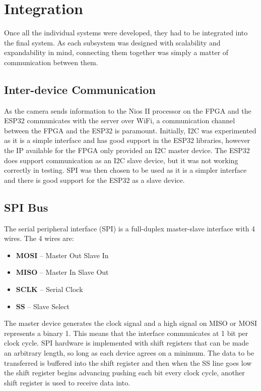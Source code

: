 \section{Integration}

Once all the individual systems were developed, they had to be integrated into the final system. As each subsystem was designed with scalability and expandability in mind, connecting them together was simply a matter of communication between them.

\subsection{Inter-device Communication}
As the camera sends information to the Nios II processor on the FPGA and the ESP32 communicates with the server over WiFi, a communication channel between the FPGA and the ESP32 is paramount. Initially, I2C was experimented as it is a simple interface and has good support in the ESP32 libraries, however the IP available for the FPGA only provided an I2C master device. The ESP32 does support communication as an I2C slave device, but it was not working correctly in testing. SPI was then chosen to be used as it is a simpler interface and there is good support for the ESP32 as a slave device.

\subsection{SPI Bus}

The serial peripheral interface (SPI) is a full-duplex master-slave interface with 4 wires. The 4 wires are:

\begin{itemize}
    \item \textbf{MOSI} -- Master Out Slave In
    \item \textbf{MISO} -- Master In Slave Out
    \item \textbf{SCLK} -- Serial Clock
    \item \textbf{SS} -- Slave Select
\end{itemize}

The master device generates the clock signal and a high signal on MISO or MOSI represents a binary 1. This means that the interface communicates at 1 bit per clock cycle. SPI hardware is implemented with shift registers that can be made an arbitrary length, so long as each device agrees on a minimum. The data to be transferred is buffered into the shift register and then when the SS line goes low the shift register begins advancing pushing each bit every clock cycle, another shift register is used to receive data into.

